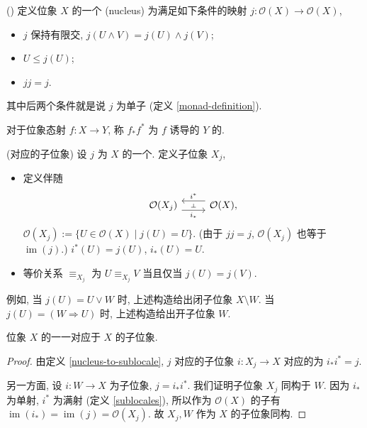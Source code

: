 \begin{definition}
	[label={nuclei}]
	{(\nc{})}
	定义位象 $X$ 的一个\emph{\nc{}} (nucleus) 为满足如下条件的映射 $j\colon \mathcal O(X)\to \mathcal O(X)$,
	\begin{itemize}
		\item $j$ 保持有限交, $j(U\land V) = j(U)\land j(V)$;
		\item $U\leq j(U)$;
		\item $jj=j$.
	\end{itemize}
	其中后两个条件就是说 $j$ 为单子 (定义 \ref{monad-definition}).
	
	对于位象态射 $f\colon X\to Y$, 称 $f_*f^*$ 为 $f$ 诱导的 $Y$ 的\nc{}.
\end{definition}

\begin{definition}
	[label={nucleus-to-sublocale}]
	{(\nc{}对应的子位象)}
	设 $j$ 为 $X$ 的一个\nc{}.
	定义子位象 $X_j$,
	\begin{itemize}
		\item 定义伴随
		\[\begin{tikzcd}[ampersand replacement=\&]
			{\mathcal O(X_j)} \& {\mathcal O(X),}
			\arrow[""{name=0, anchor=center, inner sep=0}, "{i^*}"', shift right=2, from=1-2, to=1-1]
			\arrow[""{name=1, anchor=center, inner sep=0}, "{i_*}"', shift right=2, from=1-1, to=1-2]
			\arrow["\dashv"{anchor=center, rotate=-90}, draw=none, from=0, to=1]
		\end{tikzcd}\]
		$\mathcal O(X_j) := \{U\in\mathcal O(X)\mid j(U) = U\}$. (由于 $jj=j$, $\mathcal O(X_j)$ 也等于 $\operatorname{im}(j)$.)
		$i^*(U) = j(U)$, $i_*(U) = U$.
		\item 等价关系 $\equiv_{X_j}$ 为 $U\equiv_{X_j} V$ 当且仅当 $j(U)=j(V).$
	\end{itemize}
\end{definition}

例如, 当 $j(U) = U\lor W$ 时, 上述构造给出闭子位象 $X\setminus W$. 当 $j(U) = (W\Rightarrow U)$ 时, 上述构造给出开子位象 $W$.

\begin{prop}
	{}
	位象 $X$ 的\nc{}一一对应于 $X$ 的子位象.
\end{prop}
\begin{proof}
	由定义 \ref{nucleus-to-sublocale}, \nc{} $j$ 对应的子位象 $i\colon X_j\to X$ 对应的\nc{}为 $i_*i^* = j$.
	
	另一方面, 设 $i\colon W\to X$ 为子位象, $j=i_*i^*$. 我们证明子位象 $X_j$ 同构于 $W$.
	因为 $i_*$ 为单射, $i^*$ 为满射 (定义 \ref{sublocales}),
	所以作为 $\mathcal O(X)$ 的子\fm{}有 $\operatorname{im}(i_*) = \operatorname{im}(j)=\mathcal O(X_j)$.
	故 $X_j, W$ 作为 $X$ 的子位象同构.
\end{proof}


